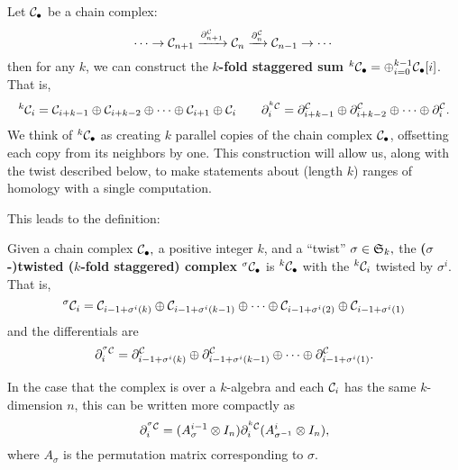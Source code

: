 \documentclass [11pt, proquest] {uwthesis}[2020/02/24]
\begin{document}
    Let $\mathcal{C}_\bullet$ be a chain complex:
    \[\cdots\to\mathcal{C}_{n+1}\xrightarrow{\partial^{\mathcal{C}}_{n+1}}\mathcal{C}_n\xrightarrow{\partial^{\mathcal{C}}_n}\mathcal{C}_{n-1}\to\cdots\]
    then for any $k$, we can construct the \textbf{$k$-fold staggered sum} $^k\mathcal{C}_\bullet=\oplus_{i=0}^{k-1}\mathcal{C}_\bullet[i]$. That is,
    \[^k\mathcal{C}_i = \mathcal{C}_{i+k-1}\oplus\mathcal{C}_{i+k-2}\oplus\cdots\oplus \mathcal{C}_{i+1}\oplus \mathcal{C}_i\qquad \partial^{^k\mathcal{C}}_{i}=\partial^{\mathcal{C}}_{i+k-1} \oplus\partial^{\mathcal{C}}_{i+k-2} \oplus\cdots\oplus\partial^{\mathcal{C}}_i.\]
    We think of $^k\mathcal{C}_\bullet$ as creating $k$ parallel copies of the chain complex $\mathcal{C}_\bullet$, offsetting each copy from its neighbors by one. This construction will allow us, along with the twist described below, to make statements about (length $k$) ranges of homology with a single computation.
    
    This leads to the definition:
    \begin{defn}\label{def:twisted-complex}
        Given a chain complex $\mathcal{C}_\bullet,$ a positive integer $k$, and a ``twist'' $\sigma\in\mathfrak{S}_k,$ the \textbf{($\sigma$-)twisted ($k$-fold staggered) complex} $^\sigma\mathcal{C}_\bullet$ is $^k\mathcal{C}_\bullet$ with the $^k\mathcal{C}_i$ twisted by $\sigma^i$. That is,
        \begin{equation}\label{eqn:twisted-complex}
            ^\sigma\mathcal{C}_i=\mathcal{C}_{i-1+\sigma^i(k)}\oplus\mathcal{C}_{i-1+\sigma^i(k-1)}\oplus\cdots\oplus \mathcal{C}_{i-1+\sigma^i(2)}\oplus \mathcal{C}_{i-1+\sigma^i(1)}
        \end{equation}
        and the differentials are
        \[\partial^{^\sigma\mathcal{C}}_i=\partial^{\mathcal{C}}_{i-1+\sigma^i(k)}\oplus\partial^{\mathcal{C}}_{i-1+\sigma^i(k-1)}\oplus\cdots\oplus \partial^{\mathcal{C}}_{i-1+\sigma^i(1)}.\]
    \end{defn}
    \begin{rmk}
        In the case that the complex is over a $k$-algebra and each $\mathcal{C}_i$ has the same $k$-dimension $n$, this can be written more compactly as
        \[\partial^{^\sigma\mathcal{C}}_i=(A_{\sigma}^{i-1}\otimes I_n)\partial_i^{^k\mathcal{C}}(A_{\sigma^{-1}}^i\otimes I_n),\]
        where $A_\sigma$ is the permutation matrix corresponding to $\sigma$.
    \end{rmk}
    
\end{document}
